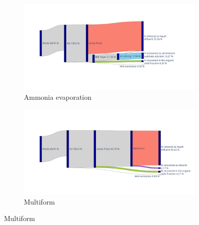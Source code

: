 \begin{refsection}[referencesCh6]
\begin{figure}[h!]
	\centering
	\begin{subfigure}[t]{0.99\textwidth}
		\centering
		\includegraphics[angle=0, width=0.85\linewidth, trim={2cm 2.8cm 2.5cm 2cm}, clip]{gfx/Chapter6/NitrogenFlow_AmmoniaEvaporation_sankey.pdf}
		\caption{Ammonia evaporation}
		\label{fig:NitrogenFlow_AmmoniaEvaporation_sankey}
	\end{subfigure}
	
	\bigskip
	
	\begin{subfigure}[t]{0.9\textwidth}
		\centering
		\includegraphics[angle=0,width=\linewidth, trim={2cm 2.5cm 0.5cm 2.5cm}, clip]{gfx/Chapter6/NitrogenFlow_MULTIFORM_sankey.pdf} 
		\caption{Multiform}
		\label{fig:NitrogenFlow_MULTIFORM_sankey}
	\end{subfigure}
	
	\bigskip
	

\end{figure}
\end{refsection}

